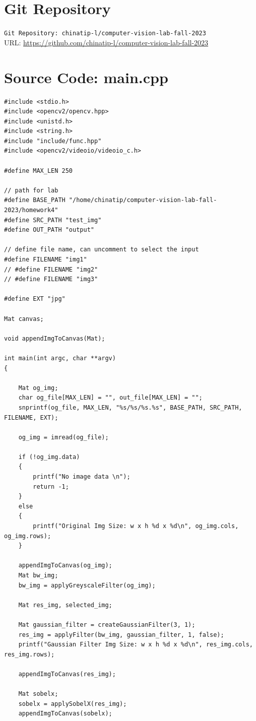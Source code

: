 \documentclass[12pt,a4paper]{report}
\begin{document}
\appendix
\chapter{Git Repository}

\verb|Git Repository: chinatip-l/computer-vision-lab-fall-2023| \\
URL: \url{https://github.com/chinatip-l/computer-vision-lab-fall-2023}

\chapter{Source Code: main.cpp}
\begin{lstlisting}
#include <stdio.h>
#include <opencv2/opencv.hpp>
#include <unistd.h>
#include <string.h>
#include "include/func.hpp"
#include <opencv2/videoio/videoio_c.h>

#define MAX_LEN 250

// path for lab
#define BASE_PATH "/home/chinatip/computer-vision-lab-fall-2023/homework4"
#define SRC_PATH "test_img"
#define OUT_PATH "output"

// define file name, can uncomment to select the input
#define FILENAME "img1"
// #define FILENAME "img2"
// #define FILENAME "img3"

#define EXT "jpg"

Mat canvas;

void appendImgToCanvas(Mat);

int main(int argc, char **argv)
{

    Mat og_img;
    char og_file[MAX_LEN] = "", out_file[MAX_LEN] = "";
    snprintf(og_file, MAX_LEN, "%s/%s/%s.%s", BASE_PATH, SRC_PATH, FILENAME, EXT);

    og_img = imread(og_file);

    if (!og_img.data)
    {
        printf("No image data \n");
        return -1;
    }
    else
    {
        printf("Original Img Size: w x h %d x %d\n", og_img.cols, og_img.rows);
    }

    appendImgToCanvas(og_img);
    Mat bw_img;
    bw_img = applyGreyscaleFilter(og_img);

    Mat res_img, selected_img;

    Mat gaussian_filter = createGaussianFilter(3, 1);
    res_img = applyFilter(bw_img, gaussian_filter, 1, false);
    printf("Gaussian Filter Img Size: w x h %d x %d\n", res_img.cols, res_img.rows);

    appendImgToCanvas(res_img);

    Mat sobelx;
    sobelx = applySobelX(res_img);
    appendImgToCanvas(sobelx);


\end{lstlisting}
\end{document}
